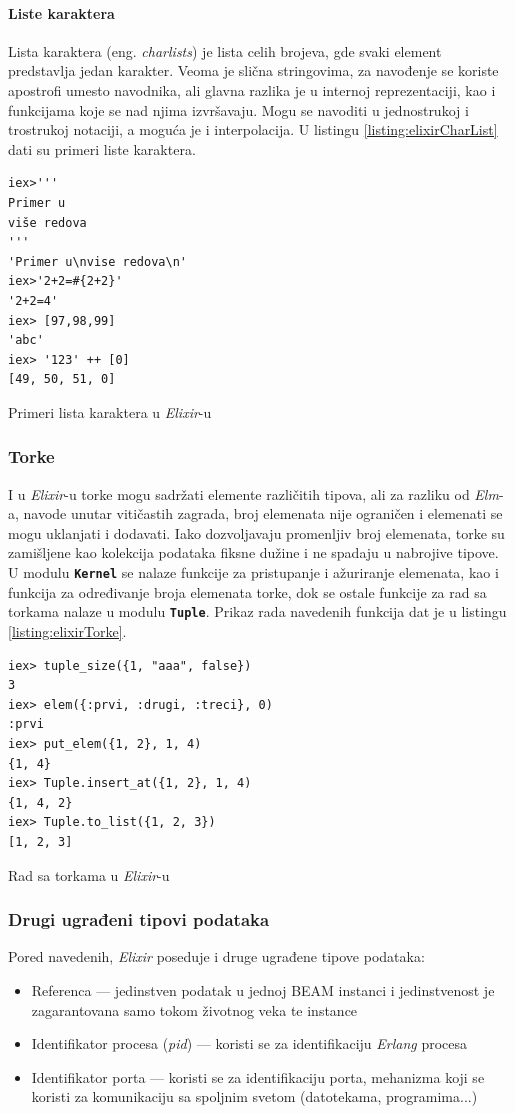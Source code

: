 \documentclass[12pt,oneside]{memoir}
\begin{document}
\paragraph{Liste karaktera }
Lista karaktera (eng. \emph{charlists}) je lista celih brojeva, gde svaki element predstavlja jedan karakter.
Veoma je slična stringovima, za navođenje se koriste apostrofi umesto navodnika, 
ali glavna razlika je u internoj reprezentaciji, kao i funkcijama koje se nad njima
izvršavaju. Mogu se navoditi u jednostrukoj i trostrukoj notaciji, a moguća je i 
interpolacija. U listingu \ref{listing:elixirCharList} dati su primeri liste karaktera.
\begin{listing}[h]
\begin{verbatim}
iex>'''
Primer u
više redova
'''
'Primer u\nvise redova\n'
iex>'2+2=#{2+2}'
'2+2=4'
iex> [97,98,99]
'abc'
iex> '123' ++ [0] 
[49, 50, 51, 0]
\end{verbatim}
\caption{Primeri lista karaktera u \emph{Elixir}-u}
\label{listing:elixirCharList}
\end{listing}

\subsubsection{Torke}
I u \emph{Elixir}-u torke mogu sadržati elemente različitih tipova, ali za razliku od \emph{Elm}-a,
navode unutar vitičastih zagrada, broj elemenata nije ograničen i elemenati se mogu uklanjati
i dodavati. Iako dozvoljavaju promenljiv broj elemenata, torke su zamišljene kao kolekcija
podataka fiksne dužine i ne spadaju u nabrojive tipove. U modulu \texttt{\textbf{Kernel}}
se nalaze funkcije za pristupanje i ažuriranje elemenata, kao i funkcija za određivanje broja
elemenata torke, dok se ostale funkcije za rad sa torkama nalaze u modulu \texttt{\textbf{Tuple}}.
Prikaz rada navedenih funkcija dat je u listingu \ref{listing:elixirTorke}.
\begin{listing}[!h]
\begin{verbatim}
iex> tuple_size({1, "aaa", false})
3
iex> elem({:prvi, :drugi, :treci}, 0)
:prvi
iex> put_elem({1, 2}, 1, 4)
{1, 4}
iex> Tuple.insert_at({1, 2}, 1, 4)
{1, 4, 2}
iex> Tuple.to_list({1, 2, 3})
[1, 2, 3]
\end{verbatim}
\caption{Rad sa torkama u \emph{Elixir}-u}
\label{listing:elixirTorke}
\end{listing}
\subsubsection{Drugi ugrađeni tipovi podataka}
Pored navedenih, \emph{Elixir} poseduje i druge ugrađene tipove podataka:
\begin{itemize}
  \item Referenca --- jedinstven podatak u jednoj BEAM instanci i jedinstvenost je
  zagarantovana samo tokom životnog veka te instance
  \item Identifikator procesa (\emph{pid}) --- koristi se za identifikaciju \emph{Erlang} procesa
  \item Identifikator porta --- koristi se za identifikaciju porta, mehanizma koji se
  koristi za komunikaciju sa spoljnim svetom (datotekama, programima...)
\end{itemize} 
\end{document}
